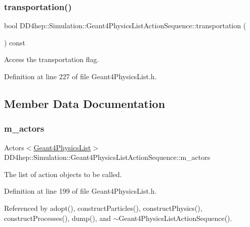 \subsubsection{\texorpdfstring{transportation()}{transportation()}}
{\footnotesize\ttfamily bool D\+D4hep\+::\+Simulation\+::\+Geant4\+Physics\+List\+Action\+Sequence\+::transportation (\begin{DoxyParamCaption}{ }\end{DoxyParamCaption}) const\hspace{0.3cm}{\ttfamily [inline]}}



Access the transportation flag. 



Definition at line 227 of file Geant4\+Physics\+List.\+h.



\subsection{Member Data Documentation}
\hypertarget{class_d_d4hep_1_1_simulation_1_1_geant4_physics_list_action_sequence_a7b456f14e717d23f85827b8e0c8bab72}{}\label{class_d_d4hep_1_1_simulation_1_1_geant4_physics_list_action_sequence_a7b456f14e717d23f85827b8e0c8bab72} 
\subsubsection{\texorpdfstring{m\+\_\+actors}{m\_actors}}
{\footnotesize\ttfamily Actors$<$\hyperlink{class_d_d4hep_1_1_simulation_1_1_geant4_physics_list}{Geant4\+Physics\+List}$>$ D\+D4hep\+::\+Simulation\+::\+Geant4\+Physics\+List\+Action\+Sequence\+::m\+\_\+actors\hspace{0.3cm}{\ttfamily [protected]}}



The list of action objects to be called. 



Definition at line 199 of file Geant4\+Physics\+List.\+h.



Referenced by adopt(), construct\+Particles(), construct\+Physics(), construct\+Processes(), dump(), and $\sim$\+Geant4\+Physics\+List\+Action\+Sequence().

